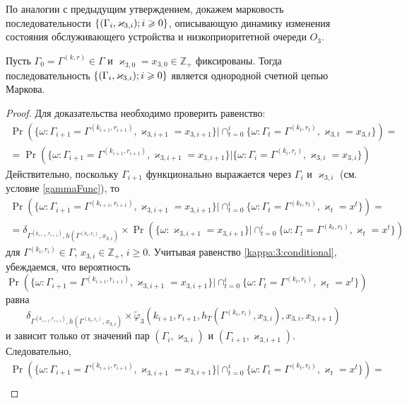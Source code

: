По аналогии с предыдущим утверждением,  докажем марковость последовательности $\MarkThree$,  описывающую динамику изменения состояния обслуживающего устройства и низкоприоритетной очереди $O_3$.
\begin{theorem}
Пусть $\Gamma_0=\Gamma^{(k, r)}\in \Gamma$ и $\varkappa_{3, 0}=x_{3, 0}\in \mathbb{Z}_+$ фиксированы. Тогда последовательность $\MarkThree$ является однородной счетной цепью Маркова.
\end{theorem}
\begin{proof}
Для доказательства необходимо проверить равенство:
\begin{multline}
\Pr (\{ \omega\colon \Gamma_{i+1} =\Gamma^{(k_{i+1},  r_{i+1})}, \varkappa_{3,  i+1} = x_{3,  i+1}\} |\cap_{t=0}^{i}\{\omega\colon  \Gamma_t=\Gamma^{(k_t, r_t)},  \varkappa_{3, t}=x_{3, t}\}) = \\
= \Pr (\{ \omega\colon \Gamma_{i+1} =\Gamma^{(k_{i+1}, r_{i+1})}, \varkappa_{3, i+1} = x_{3, i+1}\} |\{\omega\colon  \Gamma_i=\Gamma^{(k_i, r_i)},  \varkappa_{3, i}=x_{3, i}\})
    \label{marktoprove:third}
\end{multline}
Действительно,  поскольку $\Gamma_{i+1}$ функционально выражается через $\Gamma_i$ и $\varkappa_{3, i}$ (см. условие \eqref{gammaFunc}),  то
\begin{multline*}
\Pr (\{ \omega\colon \Gamma_{i+1} =\Gamma^{(k_{i+1}, r_{i+1})}, \varkappa_{3, i+1} = x_{3, i+1}\} |\cap_{t=0}^{i}\{\omega\colon  \Gamma_t=\Gamma^{(k_t, r_t)},  \varkappa_t=x^t\})=\\
=\delta_{\Gamma^{(k_{i+1}, r_{i+1})}, h(\Gamma^{(k_i, r_i)}, x_{3, i})}\times \Pr (\{ \omega\colon  \varkappa_{3, i+1} = x_{3, i+1}\} |\cap_{t=0}^{i}\{\omega\colon  \Gamma_t=\Gamma^{(k_t, r_t)},  \varkappa_t=x^t\})
\end{multline*}
для $\Gamma^{(k_i, r_i)}\in \Gamma$,  $x_{3, i}\in {\mathbb Z}_+$,  $i\geqslant 0$. Учитывая равенство \eqref{kappa:3:conditional},  убеждаемся,  что вероятность 
$$
\Pr (\{\omega\colon  \Gamma_{i+1} =\Gamma^{(k_{i+1},  r_{i+1})},  \varkappa_{3,  i+1} = x_{3,  i+1}\} |\cap_{t=0}^{i}\{\omega\colon \Gamma_t=\Gamma^{(k_t,  r_t)},   \varkappa_t=x^t\}) 
$$ 
равна
$$
\delta_{\Gamma^{(k_{i+1},  r_{i+1})},  h(\Gamma^{(k_i,  r_i)},  x_{3,  i})} \times \widetilde{\varphi}_3(k_{i+1},  r_{i+1},  h_T(\Gamma^{(k_i,  r_i)},  x_{3,  i}),  x_{3,  i},  x_{3,  i+1})
$$
и зависит только от значений пар $(\Gamma_i,  \varkappa_{3,  i})$ и $(\Gamma_{i+1},  \varkappa_{3,  i+1})$. Следовательно,   
\begin{multline*}
\Pr (\{ \omega\colon \Gamma_{i+1} =\Gamma^{(k_{i+1},  r_{i+1})},  \varkappa_{3,  i+1} = x_{3,  i+1}\} |\cap_{t=0}^{i}\{\omega\colon \Gamma_t=\Gamma^{(k_t,  r_t)},   \varkappa_t=x^t\})=\\

\end{multline*}
\end{proof}
